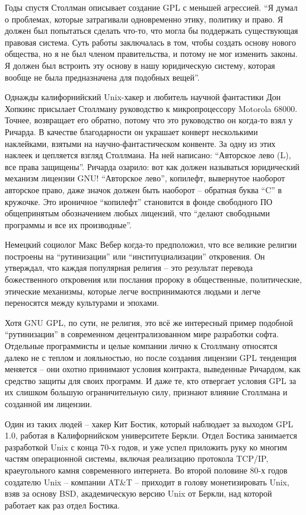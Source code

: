 Годы спустя Столлман описывает создание GPL с меньшей агрессией. \enquote{Я думал о проблемах, которые затрагивали одновременно этику, политику и право. Я должен был попытаться сделать что-то, что могла бы поддержать существующая правовая система. Суть работы заключалась в том, чтобы создать основу нового общества, но я не был членом правительства, и потому не мог изменить законы. Я должен был встроить эту основу в нашу юридическую систему, которая вообще не была предназначена для подобных вещей}.

Однажды калифорнийский Unix-хакер и любитель научной фантастики Дон Хопкинс присылает Столлману руководство к микропроцессору Motorola 68000. Точнее, возвращает его обратно, потому что это руководство он когда-то взял у Ричарда. В качестве благодарности он украшает конверт несколькими наклейками, взятыми на научно-фантастическом конвенте. За одну из этих наклеек и цепляется взгляд Столлмана. На ней написано: \enquote{Авторское лево (L), все права защищены}. Ричарда озарило: вот как должен называться юридический механизм лицензии GNU! \enquote{Авторское лево}, копилефт, вывернутое наоборот авторское право, даже значок должен быть наоборот -- обратная буква \enquote{C} в кружочке. Это ироничное \enquote{копилефт} становится в фонде свободного ПО общепринятым обозначением любых лицензий, что \enquote{делают свободными программы и все их производные}.

Немецкий социолог Макс Вебер когда-то предположил, что все великие религии построены на \enquote{рутинизации} или \enquote{институциализации} откровения. Он утверждал, что каждая популярная религия -- это результат перевода божественного откровения или послания пророку в общественные, политические, этические механизмы, которые легче воспринимаются людьми и легче переносятся между культурами и эпохами.

Хотя GNU GPL, по сути, не религия, это всё же интересный пример подобной \enquote{рутинизации} в современном децентрализованном мире разработки софта. Отдельные программисты и целые компании лично к Столлману относятся далеко не с теплом и лояльностью, но после создания лицензии GPL тенденция меняется -- они охотно принимают условия контракта, выведенные Ричардом, как средство защиты для своих программ. И даже те, кто отвергает условия GPL за их слишком большую ограничительную силу, признают влияние Столлмана и созданной им лицензии.

Один из таких людей -- хакер Кит Бостик, который наблюдает за выходом GPL 1.0, работая в Калифорнийском университете Беркли. Отдел Бостика занимается разработкой Unix с конца 70-х годов, и уже успел приложить руку ко многим частям операционной системы, включая реализацию протокола TCP/IP, краеугольного камня современного интернета. Во второй половине 80-х годов создателю Unix -- компании AT\&T -- приходит в голову монетизировать Unix, взяв за основу BSD, академическую версию Unix от Беркли, над которой работает как раз отдел Бостика.

